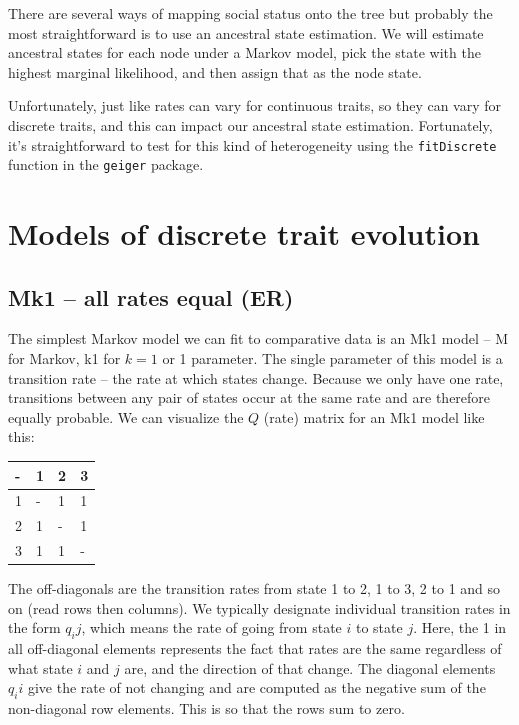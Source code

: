 \documentclass[]{book}
\begin{document}
There are several ways of mapping social status onto the tree but
probably the most straightforward is to use an ancestral state
estimation. We will estimate ancestral states for each node under a
Markov model, pick the state with the highest marginal likelihood, and
then assign that as the node state.

Unfortunately, just like rates can vary for continuous traits, so they
can vary for discrete traits, and this can impact our ancestral state
estimation. Fortunately, it's straightforward to test for this kind of
heterogeneity using the \texttt{fitDiscrete} function in the
\texttt{geiger} package.

\section{Models of discrete trait
evolution}\label{models-of-discrete-trait-evolution}

\subsection{Mk1 -- all rates equal (ER)}\label{mk1-all-rates-equal-er}

The simplest Markov model we can fit to comparative data is an Mk1 model
-- M for Markov, k1 for \(k = 1\) or 1 parameter. The single parameter
of this model is a transition rate -- the rate at which states change.
Because we only have one rate, transitions between any pair of states
occur at the same rate and are therefore equally probable. We can
visualize the \(Q\) (rate) matrix for an Mk1 model like this:

\begin{longtable}[]{@{}llll@{}}
\toprule
- & 1 & 2 & 3\tabularnewline
\midrule
\endhead
1 & - & 1 & 1\tabularnewline
2 & 1 & - & 1\tabularnewline
3 & 1 & 1 & -\tabularnewline
\bottomrule
\end{longtable}

The off-diagonals are the transition rates from state 1 to 2, 1 to 3, 2
to 1 and so on (read rows then columns). We typically designate
individual transition rates in the form \(q_ij\), which means the rate
of going from state \(i\) to state \(j\). Here, the 1 in all
off-diagonal elements represents the fact that rates are the same
regardless of what state \(i\) and \(j\) are, and the direction of that
change. The diagonal elements \(q_ii\) give the rate of not changing and
are computed as the negative sum of the non-diagonal row elements. This
is so that the rows sum to zero.
\end{document}

